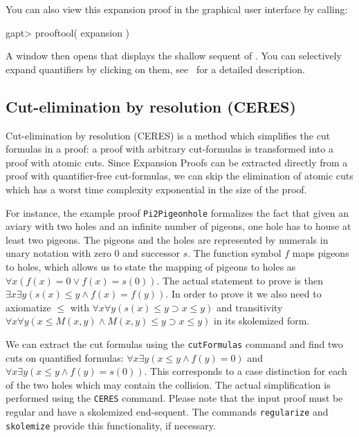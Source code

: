 \documentclass[a4paper,11pt]{article}
\newcommand{\impl}{\supset} %
\renewcommand{\land}{\wedge}
\renewcommand{\lor}{\vee}
\newcommand{\cli}[1]{{\ttfamily {#1}}}
\begin{document}
You can also view this expansion proof in the graphical user interface by
calling:
\begin{clilisting}
gapt> prooftool( expansion )

\end{clilisting}

A window then opens that displays the shallow sequent of \cli{expansion}.  You
can selectively expand quantifiers by clicking on them,
see~\cite{Hetzl13Understanding} for a detailed description.

\subsection{Cut-elimination by resolution (CERES)}\label{sec:ceres}

Cut-elimination by resolution (CERES) is a method which simplifies the cut
 formulas in a proof: a proof with arbitrary cut-formulas is transformed
 into a proof with atomic cuts. Since Expansion Proofs can be extracted
 directly from a proof with quantifier-free cut-formulas, we can skip
 the elimination of atomic cuts which has a worst time complexity
 exponential in the size of the proof.

For instance, the example proof \texttt{Pi2Pigeonhole} formalizes
 the fact that given an aviary with two holes and an infinite number
 of pigeons, one hole has to house at least two pigeons. The pigeons and
 the holes are represented by numerals in unary notation with zero $0$ and
 successor $s$. The function symbol $f$ maps pigeons to holes, which allows us
 to state the mapping of pigeons to holes as
 $\forall x (f(x) = 0 \lor f(x) = s(0))$. The actual statement to prove is then
 $\exists x \exists y (s(x) \leq y \land f(x) = f(y))$. In order to prove it
 we also need to axiomatize $\leq$ with
 $\forall x \forall y (s(x) \leq y \impl x \leq y)$ and transitivity
 $\forall x \forall y (x \leq M(x,y) \land M(x,y) \leq y \impl x \leq y)$ in its
 skolemized form.

We can extract the cut formulas using the \texttt{cutFormulas} command and find two
 cuts on quantified formulas: $\forall x \exists y (x \leq y \land f(y) = 0)$
 and $\forall x \exists y (x \leq y \land f(y) = s(0))$. This corresponds to a
 case distinction for each of the two holes which may contain the collision.
The actual simplification is performed using the \texttt{CERES} command. Please note
 that the input proof must be regular and have a skolemized end-sequent. The
 commands \texttt{regularize} and \texttt{skolemize} provide this functionality,
 if necessary.
\end{document}
